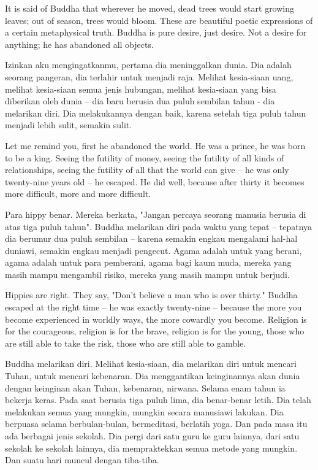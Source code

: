 \english
It is said of Buddha that wherever he moved, dead trees would start growing leaves; out of season, trees would bloom. These are beautiful poetic expressions of a certain metaphysical truth. Buddha is pure desire, just desire. Not a desire for anything; he has abandoned all objects.

\bahasa
Izinkan aku mengingatkanmu, pertama dia meninggalkan dunia. Dia adalah seorang pangeran, dia terlahir untuk menjadi raja. Melihat kesia-siaan uang, melihat kesia-siaan semua jenis hubungan, melihat kesia-siaan yang bisa diberikan oleh dunia -- dia baru berusia dua puluh sembilan tahun - dia melarikan diri. Dia melakukannya dengan baik, karena setelah tiga puluh tahun menjadi lebih sulit, semakin sulit.

\english
Let me remind you, first he abandoned the world. He was a prince, he was born to be a king. Seeing the futility of money, seeing the futility of all kinds of relationships, seeing the futility of all that the world can give -- he was only twenty-nine years old -- he escaped. He did well, because after thirty it becomes more difficult, more and more difficult.

\bahasa
Para hippy benar. Mereka berkata, "Jangan percaya seorang manusia berusia di atas tiga puluh tahun". Buddha melarikan diri pada waktu yang tepat -- tepatnya dia berumur dua puluh sembilan -- karena semakin engkau mengalami hal-hal duniawi, semakin engkau menjadi pengecut. Agama adalah untuk yang berani, agama adalah untuk para pemberani, agama bagi kaum muda, mereka yang masih mampu mengambil risiko, mereka yang masih mampu untuk berjudi.

\english
Hippies are right. They say, "Don't believe a man who is over thirty." Buddha escaped at the right time -- he was exactly twenty-nine -- because the more you become experienced in worldly ways, the more cowardly you become. Religion is for the courageous, religion is for the brave, religion is for the young, those who are still able to take the risk, those who are still able to gamble.

\bahasa
Buddha melarikan diri. Melihat kesia-siaan, dia melarikan diri untuk mencari Tuhan, untuk mencari kebenaran. Dia menggantikan keinginannya akan dunia dengan keinginan akan Tuhan, kebenaran, nirwana. Selama enam tahun ia bekerja keras. Pada saat berusia tiga puluh lima, dia benar-benar letih. Dia telah melakukan semua yang mungkin, mungkin secara manusiawi lakukan. Dia berpuasa selama berbulan-bulan, bermeditasi, berlatih yoga. Dan pada masa itu ada berbagai jenis sekolah. Dia pergi dari satu guru ke guru lainnya, dari satu sekolah ke sekolah lainnya, dia mempraktekkan semua metode yang mungkin. Dan suatu hari muncul dengan tiba-tiba.
